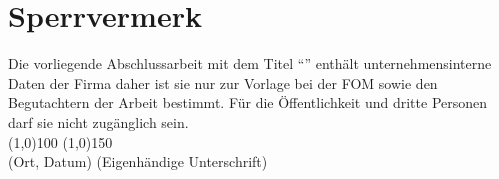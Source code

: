 \section*{Sperrvermerk}
Die vorliegende Abschlussarbeit mit dem Titel ``\MyTitel{}'' enthält unternehmensinterne Daten der Firma \MyFirma{} daher ist sie nur zur Vorlage bei der FOM sowie den Begutachtern der Arbeit bestimmt. Für die Öffentlichkeit und dritte Personen darf sie nicht zugänglich sein.
\\[5cm]
\line(1,0){100} \hfill \line(1,0){150}\\
(Ort, Datum) \hfill (Eigenhändige Unterschrift)
